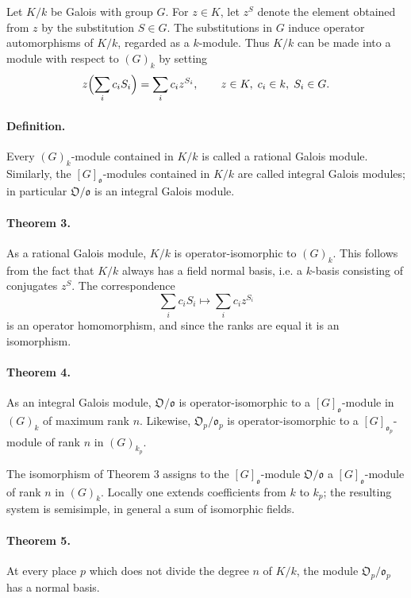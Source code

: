 \documentclass[11pt]{article}
\providecommand{\frako}{\mathfrak o}
\providecommand{\frakO}{\mathfrak O}
\begin{document}
Let \(K/k\) be Galois with group \(G\). For \(z\in K\), let \(z^S\) denote the element obtained from \(z\) by the substitution \(S\in G\). The substitutions in \(G\) induce operator automorphisms of \(K/k\), regarded as a \(k\)-module. Thus \(K/k\) can be made into a module with respect to \((G)_k\) by setting
\[
        z\Bigl(\sum_i c_iS_i\Bigr)=\sum_i c_i z^{S_i},
        \qquad z\in K,\; c_i\in k,\; S_i\in G.
\]

\paragraph{Definition.}
Every \((G)_k\)-module contained in \(K/k\) is called a rational Galois module. Similarly, the \([G]_{\frako}\)-modules contained in \(K/k\) are called integral Galois modules; in particular \(\frakO/\frako\) is an integral Galois module.

\paragraph{Theorem 3.}
As a rational Galois module, \(K/k\) is operator-isomorphic to \((G)_k\). This follows from the fact that \(K/k\) always has a field normal basis, i.e. a \(k\)-basis consisting of conjugates \(z^S\). The correspondence
\[
        \sum_i c_iS_i\longmapsto \sum_i c_i z^{S_i}
\]
is an operator homomorphism, and since the ranks are equal it is an isomorphism.

\paragraph{Theorem 4.}
As an integral Galois module, \(\frakO/\frako\) is operator-isomorphic to a \([G]_{\frako}\)-module in \((G)_k\) of maximum rank \(n\). Likewise, \(\frakO_p/\frako_p\) is operator-isomorphic to a \([G]_{\frako_p}\)-module of rank \(n\) in \((G)_{k_p}\).

The isomorphism of Theorem 3 assigns to the \([G]_{\frako}\)-module \(\frakO/\frako\) a \([G]_{\frako}\)-module of rank \(n\) in \((G)_k\). Locally one extends coefficients from \(k\) to \(k_p\); the resulting system is semisimple, in general a sum of isomorphic fields.

\paragraph{Theorem 5.}
At every place \(p\) which does not divide the degree \(n\) of \(K/k\), the module \(\frakO_p/\frako_p\) has a normal basis.
\end{document}

